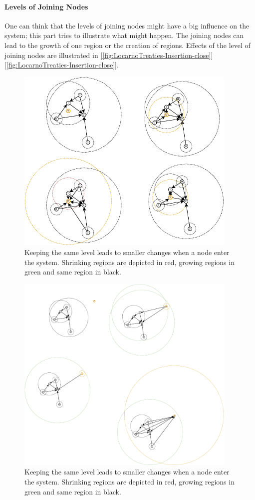 \documentclass[a4paper,11pt,oneside]{report}
\begin{document}
\paragraph{Levels of Joining Nodes}
One can think that the levels of joining nodes might have a big influence on the
system; this part tries to illustrate what might happen. The joining nodes can
lead to the growth of one region or the creation
of regions. Effects of the level of joining nodes are illustrated in
[\autoref{fig:LocarnoTreaties-Insertion-close}][\autoref{fig:LocarnoTreaties-Insertion-close}].

\begin{figure}[!h] 
\centering
\includegraphics[width=300pt]{figures/LocarnoTreaties-Insertion-close}
\caption{Keeping the same level leads to smaller changes when a node enter the
 system. Shrinking regions are depicted in red, growing regions in green and
 same region in black.} \label{fig:LocarnoTreaties-Insertion-close}
\end{figure}

\begin{figure}[!h] 
\centering
\includegraphics[width=300pt]{figures/LocarnoTreaties-Insertion-far}
\caption{Keeping the same level leads to smaller changes when a node enter the
 system. Shrinking regions are depicted in red, growing regions in green and
 same region in black.} \label{fig:LocarnoTreaties-Insertion-far}
\end{figure}
\end{document}
